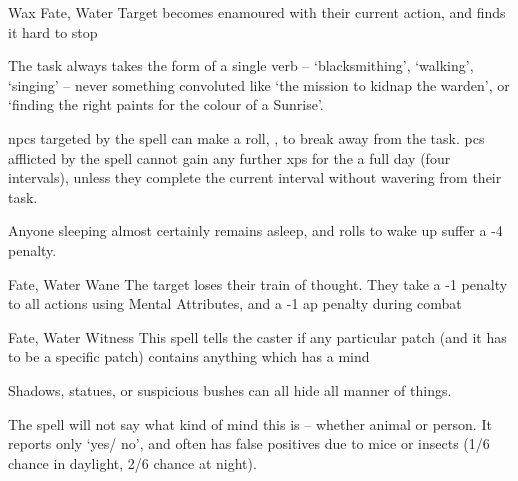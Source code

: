   {}%
  {Wax}%
  {Fate, Water}%
  {}%
  {Target becomes enamoured with their current action, and finds it hard to stop}%
  {
    The task always takes the form of a single verb -- `blacksmithing', `walking', `singing' -- never something convoluted like `the mission to kidnap the warden', or `finding the right paints for the colour of a Sunrise'.

    \Glspl{npc} targeted by the spell can make a  roll, \tn[8], to break away from the task.
    \Glspl{pc} afflicted by the spell cannot gain any further \glspl{xp} for the a full day (four \glspl{interval}), unless they complete the current \gls{interval} without wavering from their task.

  Anyone sleeping almost certainly remains asleep, and rolls to wake up suffer a -4 penalty.}

  {Fate, Water}%
  {Wane}%
  {}%
  {}%
  {The target loses their train of thought.
    They take a -1 penalty to all actions using Mental Attributes, and a -1 \gls{ap} penalty during combat}%
  {}

  {Fate, Water}%
  {Witness}%
  {}%
  {}%
  {This spell tells the caster if any particular patch (and it has to be a specific patch) contains anything which has a mind}%
  {Shadows, statues, or suspicious bushes can all hide all manner of things.

    The spell will not say what kind of mind this is -- whether animal or person.
    It reports only `yes/ no', and often has false positives due to mice or insects (1/6 chance in daylight, 2/6 chance at night).}
